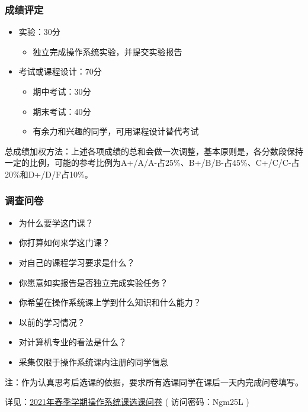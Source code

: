\begin{frame}[fragile]
    \frametitle{成绩评定}
    \begin{itemize}
        \item 实验：30分
        \begin{itemize}
            \item 独立完成操作系统实验，并提交实验报告
        \end{itemize} %
        \item 考试或课程设计：70分
        \begin{itemize}
            \item 期中考试：30分
            \item 期末考试：40分
            \item 有余力和兴趣的同学，可用课程设计替代考试
        \end{itemize}

    \end{itemize} %

    总成绩加权方法：上述各项成绩的总和会做一次调整，基本原则是，各分数段保持一定的比例，可能的参考比例为A+/A/A-占25\%、B+/B/B-占45\%、C+/C/C-占20\%和D+/D/F占10\%。 

\end{frame}

    
    \begin{frame}
        \frametitle{调查问卷}
        \begin{itemize}
            \item 为什么要学这门课？ %
            \item 你打算如何来学这门课？
            \item 对自己的课程学习要求是什么？
            \item 你愿意如实报告是否独立完成实验任务？
            \item 你希望在操作系统课上学到什么知识和什么能力？ %
            \item 以前的学习情况？
            \item 对计算机专业的看法是什么？ %
            \item 采集仅限于操作系统课内注册的同学信息
        \end{itemize}
        
    \newline
    \newline
    
    注：作为认真思考后选课的依据，要求所有选课同学在课后一天内完成问卷填写。
    
    详见：\href{http://oscourse2019.mikecrm.com/te8s1h2}{2021年春季学期操作系统课选课问卷} ( 访问密码：Ngm25L )
    
    \end{frame}


